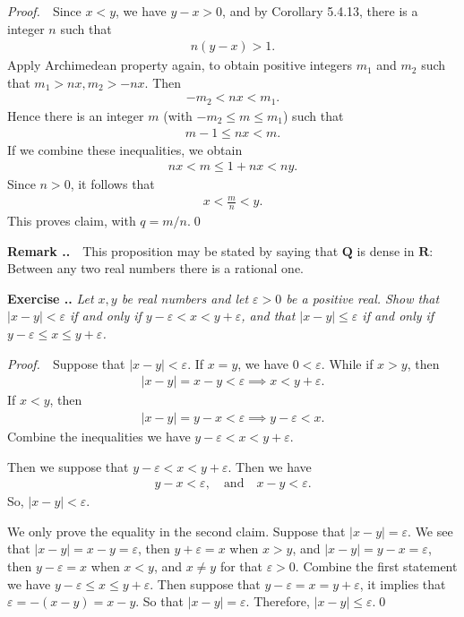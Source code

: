 \documentclass{book}
\newcommand{\pff}{\vspace{.25em}\noindent\emph{Proof.}~~}
\newcommand{\remark}{\vspace{.5em}\noindent\textbf{Remark \textbf{\theExercise}}~~}
\newcounter{Exercise}[section]
\renewcommand{\theExercise}{\thesection.\arabic{Exercise}.}
\newcommand{\new}{\vspace{1.5em}\noindent\textbf{{Exercise \stepcounter{Exercise}\textbf{\theExercise}}} }
\begin{document}
\pff Since $x<y$, we have $y-x>0$, and by Corollary 5.4.13, there is a integer $n$ such that
    \begin{align*}
        n(y-x)>1.
    \end{align*}
Apply Archimedean property again, to obtain positive integers $m_1$ and $m_2$ such that $m_1>nx,m_2>-nx$. Then
    \begin{align*}
        -m_2<nx<m_1.
    \end{align*}
Hence there is an integer $m$ (with $-m_2\leq m\leq m_1$) such that
    \begin{align*}
        m-1\leq nx<m.
    \end{align*}
If we combine these inequalities, we obtain
    \begin{align*}
        nx<m\leq 1+nx<ny.
    \end{align*}
Since $n>0$, it follows that
    \begin{align*}
        x<\frac{m}{n}<y.
    \end{align*}
This proves claim, with $q=m/n$.\qed

\remark This proposition may be stated by saying that $\mathbf{Q}$ is dense in $\mathbf{R}$: Between any two real numbers there is a rational one.

\new\emph{Let $x,y$ be real numbers and let $\varepsilon>0$ be a positive real. Show that $|x-y|<\varepsilon$ if and only if $y-\varepsilon<x<y+\varepsilon$, and that $|x-y|\leq\varepsilon$ if and only if $y-\varepsilon\leq x\leq y+\varepsilon$.}

\pff Suppose that $|x-y|<\varepsilon$. If $x=y$, we have $0<\varepsilon$. While if $x>y$, then
    \begin{align*}
        |x-y|=x-y<\varepsilon\implies x<y+\varepsilon.
    \end{align*}
If $x<y$, then
    \begin{align*}
        |x-y|=y-x<\varepsilon\implies y-\varepsilon<x.
    \end{align*}
Combine the inequalities we have $y-\varepsilon<x<y+\varepsilon$.

Then we suppose that $y-\varepsilon<x<y+\varepsilon$. Then we have
    \begin{align*}
        y-x<\varepsilon,\quad\text{and}\quad x-y<\varepsilon.
    \end{align*}
So, $|x-y|<\varepsilon$.

We only prove the equality in the second claim. Suppose that $|x-y|=\varepsilon$. We see that $|x-y|=x-y=\varepsilon$, then $y+\varepsilon=x$ when $x>y$, and $|x-y|=y-x=\varepsilon$, then $y-\varepsilon=x$ when $x<y$, and $x\neq y$ for that $\varepsilon>0$. Combine the first statement we have $y-\varepsilon\leq x\leq y+\varepsilon$. Then suppose that $y-\varepsilon=x=y+\varepsilon$, it implies that $\varepsilon=-(x-y)=x-y$. So that $|x-y|=\varepsilon$. Therefore, $|x-y|\leq\varepsilon$.\qed
\end{document}
